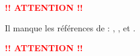 \documentclass[a4paper]{article}
\begin{document}

\newpage
\begin{center}
  \textcolor{red}{\Huge\bfseries !! ATTENTION !!}\par
  Il manque les références de : \cite{bell1995information}, \cite{cardoso1997infomax}, \cite{comon1994independent} et \cite{LeBorgne}.\par
  \textcolor{red}{\Huge\bfseries !! ATTENTION !!}
\end{center}


{}

\label{lastpage}
\end{document}
